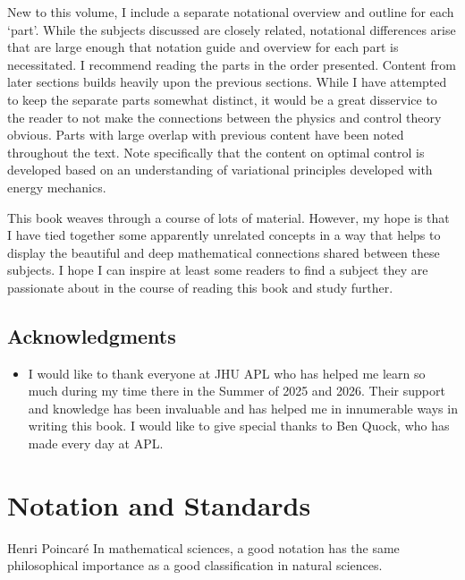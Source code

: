 New to this volume, I include a separate notational overview and outline for each `part'. While the subjects discussed are closely related, notational differences arise that are large enough that notation guide and overview for each part is necessitated. I recommend reading the parts in the order presented. Content from later sections builds heavily upon the previous sections. While I have attempted to keep the separate parts somewhat distinct, it would be a great disservice to the reader to not make the connections between the physics and control theory obvious. Parts with large overlap with previous content have been noted throughout the text. Note specifically that the content on optimal control is developed based on an understanding of variational principles developed with energy mechanics.

This book weaves through a course of lots of material. However, my hope is that I have tied together some apparently unrelated concepts in a way that helps to display the beautiful and deep mathematical connections shared between these subjects. I hope I can inspire at least some readers to find a subject they are passionate about in the course of reading this book and study further.

\section*{Acknowledgments}
\begin{itemize}
\item I would like to thank everyone at JHU APL who has helped me learn so much during my time there in the Summer of 2025 and 2026. Their support and knowledge has been invaluable and has helped me in innumerable ways in writing this book. I would like to give special thanks to Ben Quock, who has made every day at APL.
\end{itemize}

\chapter*{Notation and Standards}

\begin{chapquote}{Henri Poincar\'e}
In mathematical sciences, a good notation has the same philosophical importance as a good classification in natural sciences.
\end{chapquote}

